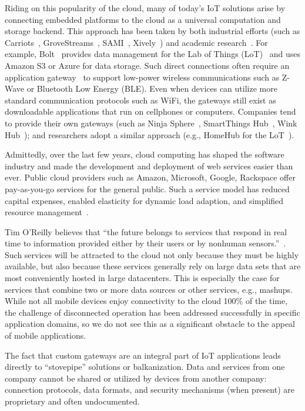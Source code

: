 Riding on this popularity of the cloud, many of today's IoT solutions arise by
connecting embedded platforms to the cloud as a universal computation and
storage backend. This approach has been taken by both industrial efforts (such
as Carriots~\cite{carriots}, GroveStreams~\cite{grovestreams}, SAMI~\cite{sami},
Xively~\cite{xively}) and academic research~\cite{gupta2014bolt,
  zachariah1001internet}. For example, Bolt~\cite{gupta2014bolt} provides data
management for the Lab of Things (LoT)~\cite{brush2013lab} and uses Amazon S3 or
Azure for data storage. Such direct connections often require an application
gateway~\cite{zachariah1001internet} to support low-power wireless
communications such as Z-Wave or Bluetooth Low Energy (BLE).  Even when devices
can utilize more standard communication protocols such as WiFi, the gateways
still exist as downloadable applications that run on cellphones or computers.
Companies tend to provide their own gateways (such as Ninja Sphere~\cite{ninja},
SmartThings Hub~\cite{smartthings}, Wink Hub~\cite{wink}); and researchers adopt
a similar approach (e.g., HomeHub for the LoT~\cite{brush2013lab}).

Admittedly, over the last few years, cloud computing has shaped the software
industry and made the development and deployment of web services easier than
ever. Public cloud providers such as Amazon, Microsoft, Google, Rackspace offer
pay-as-you-go services for the general public.  Such a service model has reduced
capital expenses, enabled elasticity for dynamic load adaption, and simplified
resource management~\cite{armbrust2010view}.

Tim O’Reilly believes that ``the future belongs to services that respond in real
time to information provided either by their users or by nonhuman
sensors.''~\cite{siegele2008let}. Such services will be attracted to the cloud
not only because they must be highly available, but also because these services
generally rely on large data sets that are most conveniently hosted in large
datacenters. This is especially the case for services that combine two or more
data sources or other services, e.g., mashups. While not all mobile devices
enjoy connectivity to the cloud 100\% of the time, the challenge of disconnected
operation has been addressed successfully in specific application domains, so we
do not see this as a significant obstacle to the appeal of mobile applications.

The fact that custom gateways are an integral part of IoT applications leads
directly to ``stovepipe'' solutions or balkanization. Data and services from one
company cannot be shared or utilized by devices from another company: connection
protocols, data formats, and security mechanisms (when present) are proprietary
and often undocumented.

